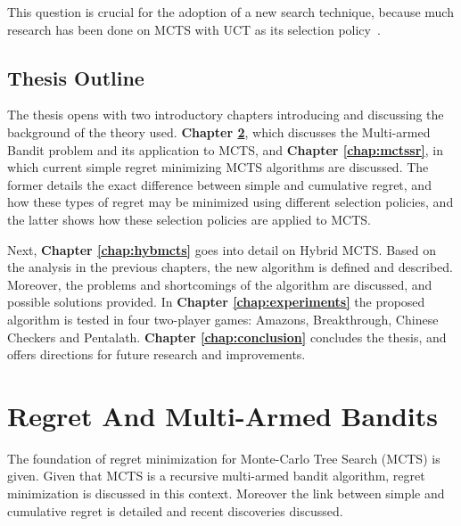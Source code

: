 \documentclass{kecsmstr}
\begin{document}
\noindent This question is crucial for the adoption of a new search technique, because much research has been done on MCTS with UCT as its selection policy~.

\section{Thesis Outline}

The thesis opens with two introductory chapters introducing and discussing the background of the theory used. \textbf{Chapter \ref{chap:mab}}, which discusses the Multi-armed Bandit problem and its application to MCTS, and \textbf{Chapter \ref{chap:mctssr}}, in which current simple regret minimizing MCTS algorithms are discussed. The former details the exact difference between simple and cumulative regret, and how these types of regret may be minimized using different selection policies, and the latter shows how these selection policies are applied to MCTS.

Next, \textbf{Chapter \ref{chap:hybmcts}} goes into detail on Hybrid MCTS. Based on the analysis in the previous chapters, the new algorithm is defined and described. Moreover, the problems and shortcomings of the algorithm are discussed, and possible solutions provided. In \textbf{Chapter \ref{chap:experiments}} the proposed algorithm is tested in four two-player games: Amazons, Breakthrough, Chinese Checkers and Pentalath. \textbf{Chapter \ref{chap:conclusion}} concludes the thesis, and offers directions for future research and improvements.

\chapter{Regret And Multi-Armed Bandits}
\label{chap:mab}
\begin{chaptercontents} The foundation of regret minimization for Monte-Carlo Tree Search (MCTS) is given. Given that MCTS is a recursive multi-armed bandit algorithm, regret minimization is discussed in this context. Moreover the link between simple and cumulative regret is detailed and recent discoveries discussed.
\end{chaptercontents}
\end{document}

